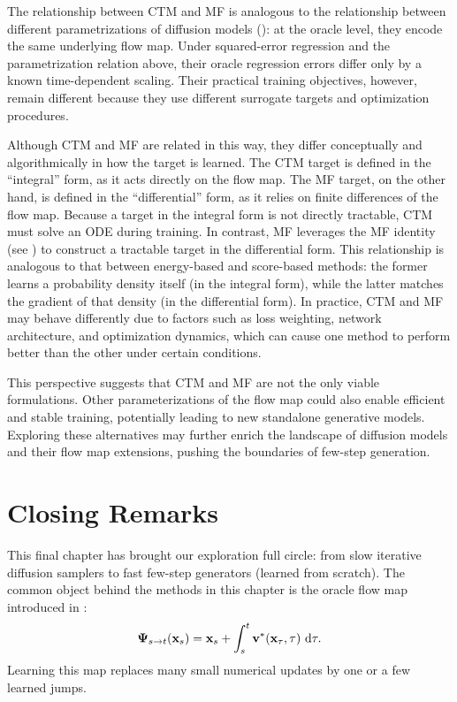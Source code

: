 The relationship between CTM and MF is analogous to the relationship between
different parametrizations of diffusion models
(): at the oracle level, they encode the
same underlying flow map. Under squared-error regression and the parametrization
relation above, their oracle regression errors differ only by a known
time-dependent scaling. Their practical training objectives, however, remain
different because they use different surrogate targets and optimization
procedures.

Although CTM and MF are related in this way, they differ conceptually and algorithmically in how the target is learned. The CTM target is defined in the ``integral'' form, as it acts directly on the flow map. The MF target, on the other hand, is defined in the ``differential'' form, as it relies on finite differences of the flow map. Because a target in the integral form is not directly tractable, CTM must solve an ODE during training. In contrast, MF leverages the MF identity (see ) to construct a tractable target in the differential form. This relationship is analogous to that between energy-based and score-based methods: the former learns a probability density itself (in the integral form), while the latter matches the gradient of that density (in the differential form). In practice, CTM and MF may behave differently due to factors such as loss weighting, network architecture, and optimization dynamics, which can cause one method to perform better than the other under certain conditions.

This perspective suggests that CTM and MF are not the only viable formulations. Other parameterizations of the flow map could also enable efficient and stable training, potentially leading to new standalone generative models. Exploring these alternatives may further enrich the landscape of diffusion models and their flow map extensions, pushing the boundaries of few-step generation.

\clearpage
\newpage

\section{Closing Remarks}\label{sec:ch11_cr}

This final chapter has brought our exploration full circle: from slow iterative
diffusion samplers to fast few-step generators (learned from scratch). The common object behind the methods in this chapter is the oracle flow map
introduced in :
\[
{\bm{\Psi}}_{s\to t}({\mathbf{x}}_s)
=
{\mathbf{x}}_s+\int_s^t {\mathbf{v}}^*({\mathbf{x}}_\tau,\tau)\,\mathop{}\!\mathrm{d} \tau.
\]
Learning this map replaces many small numerical updates by one or a few learned
jumps.


